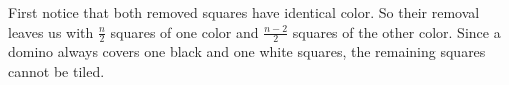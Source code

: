 \begin{questions}
\begin{solution}
First notice that both removed squares have identical color. So their removal leaves us with $\frac{n}{2}$ squares of one color and $\frac{n-2}{2}$ squares of the other color. Since a domino always covers one black and one white squares, the remaining squares cannot be tiled.
\end{solution}


 
 
\end{questions}


